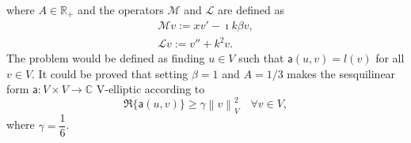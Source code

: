 where $A \in \mathbb{R}_{+}$ and the operators $\mathcal{M}$ and $\mathcal{L}$ are defined as
\begin{equation}
    \begin{aligned}
        \mathcal{M}v:=xv'-\imath k \beta v,\\
        \mathcal{L}v:= v''+k^2v.
    \end{aligned}
\end{equation}
The problem would be defined as finding $u \in V$ such that $\mathsf{a}(u,v)=l(v)$ for all $v \in V$. It could be proved that setting $\beta = 1$ and $A = 1/3$ makes the sesquilinear form $\mathsf{a}: V \times V \to \mathbb{C}$ V-elliptic according to
\begin{equation}
    \mathfrak{R}\{\mathsf{a}(u, v) \} \ge \gamma \left\| v \right\|_V^2 \quad \forall v \in V,
\end{equation}
where $\gamma = \dfrac{1}{6}$.

